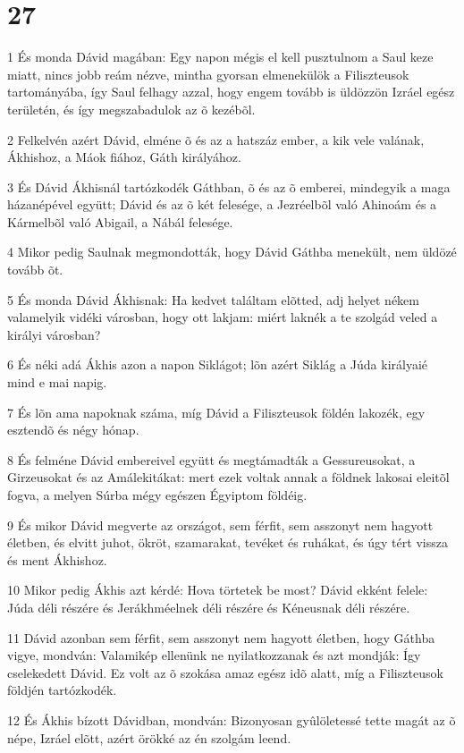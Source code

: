 \chapter{27}

\par 1 És monda Dávid magában: Egy napon mégis el kell pusztulnom a Saul keze miatt, nincs jobb reám nézve, mintha gyorsan elmenekülök a Filiszteusok tartományába, így Saul felhagy azzal, hogy engem tovább is üldözzön Izráel egész területén, és így megszabadulok az õ kezébõl.
\par 2 Felkelvén azért Dávid, elméne õ és az a hatszáz ember, a kik vele valának, Ákhishoz, a Máok fiához, Gáth királyához.
\par 3 És Dávid Ákhisnál tartózkodék Gáthban, õ és az õ emberei, mindegyik a maga házanépével együtt; Dávid és az õ két felesége, a Jezréelbõl való Ahinoám és a Kármelbõl való Abigail, a Nábál felesége.
\par 4 Mikor pedig Saulnak megmondották, hogy Dávid Gáthba menekült, nem üldözé tovább õt.
\par 5 És monda Dávid Ákhisnak: Ha kedvet találtam elõtted, adj helyet nékem valamelyik vidéki városban, hogy ott lakjam: miért laknék a te szolgád veled a királyi városban?
\par 6 És néki adá Ákhis azon a napon Siklágot; lõn azért Siklág a Júda királyaié mind e mai napig.
\par 7 És lõn ama napoknak száma, míg Dávid a Filiszteusok földén lakozék, egy esztendõ és négy hónap.
\par 8 És felméne Dávid embereivel együtt és megtámadták a Gessureusokat, a Girzeusokat és az Amálekitákat: mert ezek voltak annak a földnek lakosai eleitõl fogva, a melyen Súrba mégy egészen Égyiptom földéig.
\par 9 És mikor Dávid megverte az országot, sem férfit, sem asszonyt nem hagyott életben, és elvitt juhot, ökröt, szamarakat, tevéket és ruhákat, és úgy tért vissza és ment Ákhishoz.
\par 10 Mikor pedig Ákhis azt kérdé: Hova törtetek be most? Dávid ekként felele: Júda déli részére és Jerákhméelnek déli részére és Kéneusnak déli részére.
\par 11 Dávid azonban sem férfit, sem asszonyt nem hagyott életben, hogy Gáthba vigye, mondván: Valamikép ellenünk ne nyilatkozzanak és azt mondják: Így cselekedett Dávid. Ez volt az õ szokása amaz egész idõ alatt, míg a Filiszteusok földjén tartózkodék.
\par 12 És Ákhis bízott Dávidban, mondván: Bizonyosan gyûlöletessé tette magát az õ népe, Izráel elõtt, azért örökké az én szolgám leend.

